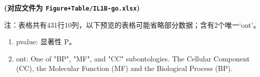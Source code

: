 \documentclass[
]{article}
\providecommand{\tightlist}{%
  \setlength{\itemsep}{0pt}\setlength{\parskip}{0pt}}
\begin{document}
\textbf{(对应文件为 \texttt{Figure+Table/IL1B-go.xlsx})}

\begin{center}\begin{tcolorbox}[colback=gray!10, colframe=gray!50, width=0.9\linewidth, arc=1mm, boxrule=0.5pt]注：表格共有431行10列，以下预览的表格可能省略部分数据；含有2个唯一`ont'。
\end{tcolorbox}
\end{center}
\begin{center}\begin{tcolorbox}[colback=gray!10, colframe=gray!50, width=0.9\linewidth, arc=1mm, boxrule=0.5pt]\begin{enumerate}\tightlist
\item pvalue:  显著性 P。
\item ont:  One of "BP", "MF", and "CC" subontologies. The Cellular Component (CC), the Molecular Function (MF) and the Biological Process (BP).
\end{enumerate}\end{tcolorbox}
\end{center}
\end{document}
